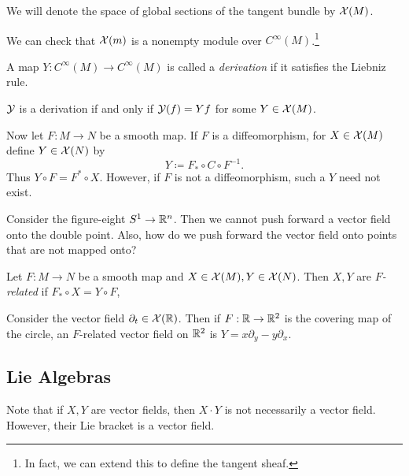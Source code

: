 \documentclass[twoside, 10pt]{article}
\begin{document}
    \begin{notn} We will denote the space of global sections of the tangent
    bundle by $\mathcal{X}(M)$.  \end{notn}

    We can check that $\mathcal{X}(m)$ is a nonempty module over
    $C^{\infty}(M)$.\footnote{In fact, we can extend this to define the tangent
    sheaf.}

    \begin{defn} A map $Y: C^{\infty}(M) \to C^{\infty}(M)$ is called a
    \textit{derivation} if it satisfies the Liebniz rule.  \end{defn}

    \begin{prop} $\mathcal{Y}$ is a derivation if and only if $\mathcal{Y}(f) = Yf$ for
    some $Y \in \mathcal{X}(M)$.  \end{prop}

    Now let $F:M \to N$ be a smooth map. If $F$ is a diffeomorphism, for $X \in
    \mathcal{X}(M)$ define $Y \in \mathcal{X}(N)$ by \[Y \coloneqq F_* \circ C \circ
    F^{-1}.\] Thus $Y \circ F = F^* \circ X$. However, if $F$ is not a
    diffeomorphism, such a $Y$ need not exist.

    \begin{exm} Consider the figure-eight $S^1 \to \mathbb{R}^n$. Then we cannot push
    forward a vector field onto the double point. Also, how do we push forward
the vector field onto points that are not mapped onto?  \end{exm}
    
    \begin{defn} Let $F:M \to N$ be a smooth map and $X \in \mathcal{X}(M), Y \in
    \mathcal{X}(N)$. Then $X,Y$ are \textit{$F$-related} if $F_* \circ X = Y \circ
F$, \end{defn}

    \begin{exm} Consider the vector field $\partial_t \in \mathcal{X}(\mathbb{R})$. Then if
    $F:\mathbb{R} \to \mathbb{R}^2$ is the covering map of the circle, an $F$-related vector
field on $\mathbb{R}^2$ is $Y = x \partial_y - y \partial_x$.  \end{exm}

    \subsection{Lie Algebras}%
    
    

    Note that if $X,Y$ are vector fields, then $X \cdot Y$ is not necessarily a
    vector field. However, their Lie bracket is a vector field.
\end{document}
